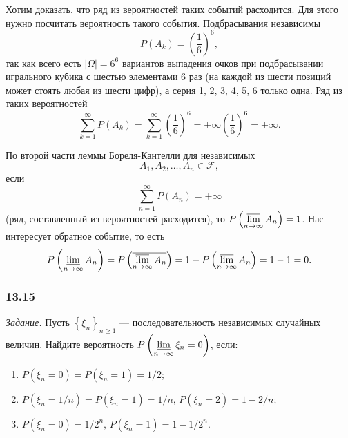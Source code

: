 Хотим доказать, что ряд из вероятностей таких событий расходится.
Для этого нужно посчитать вероятность такого события.
Подбрасывания независимы
$$P \left( A_k \right) =
\left( \frac{1}{6} \right)^6,$$
так как всего есть $ \left| \Omega \right| = 6^6$ вариантов выпадения очков при подбрасывании игрального кубика с шестью элементами 6 раз
(на каждой из шести позиций может стоять любая из шести цифр),
а серия 1, 2, 3, 4, 5, 6 только одна.
Ряд из таких вероятностей
$$ \sum \limits_{k=1}^{ \infty } P \left( A_k \right) =
\sum \limits_{k=1}^{ \infty } \left( \frac{1}{6} \right)^6 =
+ \infty \left( \frac{1}{6} \right)^6 =
+ \infty.$$

По второй части леммы Бореля-Кантелли для независимых
$$A_1, A_2, \dotsc, A_n \in \mathcal{F},$$
если
$$ \sum \limits_{n=1}^{ \infty } P \left( A_n \right) =
+ \infty $$
(ряд, составленный из вероятностей расходится), то $P \left( \varlimsup \limits_{n \to \infty } A_n \right) = 1$.
Нас интересует обратное событие,
то есть
$$P \left( \varliminf \limits_{n \to \infty } A_n \right) =
P \left( \overline{ \varlimsup \limits_{n \to \infty } A_n} \right) =
1 - P \left( \varlimsup \limits_{n \to \infty } A_n \right) =
1 - 1 =
0.$$

\subsubsection*{13.15}

\textit{Задание.} Пусть $ \left\{ \xi_n \right\}_{n \geq 1}$ --- последовательность независимых случайных величин.
Найдите вероятность $P \left( \varliminf \limits_{n \to \infty } \xi_n = 0 \right) $, если:
\begin{enumerate}[label=\alph*)]
\item $P \left( \xi_n = 0 \right) = P \left( \xi_n = 1 \right) = 1/2$;
\item $P \left( \xi_n = 1/n \right) = P \left( \xi_n = 1 \right) = 1/n, \, P \left( \xi_n = 2 \right) = 1 - 2/n$;
\item $P \left( \xi_n = 0 \right) = 1/2^n, \, P \left( \xi_n = 1 \right) = 1 - 1/2^n$.
\end{enumerate}

